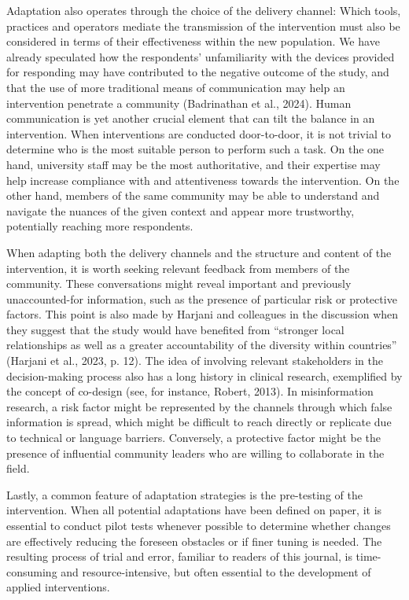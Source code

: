 \documentclass[authordate, reflection, issue]{jote-new-article}
\begin{document}
	Adaptation also operates through the choice of the delivery channel: Which tools, practices and operators mediate the transmission of the intervention must also be considered in terms of their effectiveness within the new population. We have already speculated how the respondents' unfamiliarity with the devices provided for responding may have contributed to the negative outcome of the study, and that the use of more traditional means of communication may help an intervention penetrate a community (Badrinathan et al., 2024). Human communication is yet another crucial element that can tilt the balance in an intervention. When interventions are conducted door-to-door, it is not trivial to determine who is the most suitable person to perform such a task. On the one hand, university staff may be the most authoritative, and their expertise may help increase compliance with and attentiveness towards the intervention. On the other hand, members of the same community may be able to understand and navigate the nuances of the given context and appear more trustworthy, potentially reaching more respondents.



	When adapting both the delivery channels and the structure and content of the intervention, it is worth seeking relevant feedback from members of the community. These conversations might reveal important and previously unaccounted-for information, such as the presence of particular risk or protective factors. This point is also made by Harjani and colleagues in the discussion when they suggest that the study would have benefited from “stronger local relationships as well as a greater accountability of the diversity within countries” (Harjani et al., 2023, p. 12). The idea of involving relevant stakeholders in the decision-making process also has a long history in clinical research, exemplified by the concept of co-design (see, for instance, Robert, 2013). In misinformation research, a risk factor might be represented by the channels through which false information is spread, which might be difficult to reach directly or replicate due to technical or language barriers. Conversely, a protective factor might be the presence of influential community leaders who are willing to collaborate in the field.



	Lastly, a common feature of adaptation strategies is the pre-testing of the intervention. When all potential adaptations have been defined on paper, it is essential to conduct pilot tests whenever possible to determine whether changes are effectively reducing the foreseen obstacles or if finer tuning is needed. The resulting process of trial and error, familiar to readers of this journal, is time-consuming and resource-intensive, but often essential to the development of applied interventions.
\end{document}
